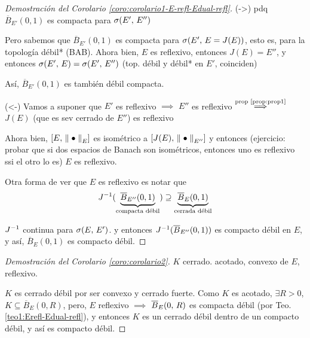 \begin{proof}[Demostración del Corolario \ref{coro:corolario1-E-refl-Edual-refl}]
(->) pdq $\overline{B}_{E'}(0, 1)$ es compacta para $\topdebil{E'}{E''}$

Pero sabemos que $\overline{B}_{E'}(0, 1)$ es compacta para $\topdebil{E'}{E = J(E)}$, esto es, para la topología débil* (BAB). Ahora bien, $E$ es reflexivo, entonces $J(E) = E''$, y entonces $\topdebil{E'}{E} = \topdebil{E'}{E''}$ (top. débil y débil* en $E'$, coinciden)

Así, $\overline{B}_{E'}(0, 1)$ es también débil compacta.

(<-) Vamos a suponer que $E'$ es reflexivo $\implies$ $E''$ es reflexivo $ \overset{\text{prop \ref{prop:prop1}}}{\implies} $ $J(E)$ (que es sev cerrado de $E''$) es reflexivo

Ahora bien, $[E,\, \norm[E]{\bullet}]$ es isométrico a $[J(E),\, \norm[E'']{\bullet}]$ y entonces (ejercicio: probar que si dos espacios de Banach son isométricos, entonces uno es reflexivo ssi el otro lo es) $E$ es reflexivo.

Otra forma de ver que $E$ es reflexivo es notar que 
\begin{equation}
    J\inv (\underbrace{\overline{B}_{E''}(0, 1)}_{\text{compacta débil}}) \supseteq \underbrace{\overline{B}_{E}(0, 1)}_{\text{cerrada débil}}
\end{equation}

$J\inv$ continua para $\topdebilE$. y entonces $J\inv ({\overline{B}_{E''}(0, 1)})$ es compacto débil en $E$, y así, ${\overline{B}_{E}(0, 1)}$ es compacto débil.

\end{proof}

\begin{proof}[Demostración del Corolario \ref{coro:corolario2}]
$K$ cerrado. acotado, convexo de $E$, reflexivo.

$K$ es cerrado débil por ser convexo y cerrado fuerte. Como $K$ es acotado, $\exists R > 0$, $K\subseteq \overline{B}_{E}(0, R)$, pero, $E$ reflexivo $\implies $ $\bolacerradaf[E]{0}{R}$ es compacta débil (por Teo. \ref{teo1:Erefl-Edual-refl}), y entonces $K$ es un cerrado débil dentro de un compacto débil, y así es compacto débil.
\end{proof}

